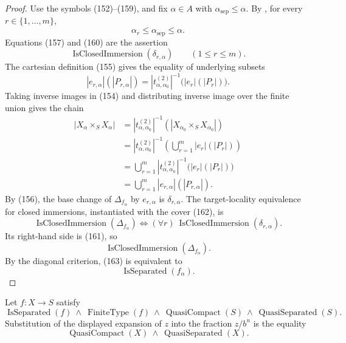 \begin{proof}
  Use the symbols (152)--(159), and fix
  $\alpha\in A$ with $\alpha_{\mathrm{sep}}\leq\alpha$.  By
  , for every
  $r\in\{1,\ldots,m\}$,
  \[
    \alpha_r\leq\alpha_{\mathrm{sep}}\leq\alpha.                 \tag{160}
  \]
  Equations (157) and (160) are the assertion
  \[
    \operatorname{IsClosedImmersion}(\delta_{r,\alpha})
      \qquad(1\leq r\leq m).
                                                                    \tag{161}
  \]
  The cartesian definition (155) gives the equality of underlying subsets
  \[
    |e_{r,\alpha}|(|P_{r,\alpha}|)
      =|t^{(2)}_{\alpha,\alpha_0}|^{-1}\bigl(|e_r|(|P_r|)\bigr).
  \]
  Taking inverse images in (154) and distributing inverse image over the
  finite union gives the chain
  \[
  \begin{aligned}
    |X_\alpha\times_SX_\alpha|
      &=|t^{(2)}_{\alpha,\alpha_0}|^{-1}
          \left(\left|X_{\alpha_0}\times_SX_{\alpha_0}\right|\right)\\
      &=|t^{(2)}_{\alpha,\alpha_0}|^{-1}
          \left(\bigcup_{r=1}^m|e_r|(|P_r|)\right)\\
      &=\bigcup_{r=1}^m
          |t^{(2)}_{\alpha,\alpha_0}|^{-1}\bigl(|e_r|(|P_r|)\bigr)\\
      &=\bigcup_{r=1}^m|e_{r,\alpha}|(|P_{r,\alpha}|).
  \end{aligned}                                                   \tag{162}
  \]
  By (156), the base change of $\Delta_{f_\alpha}$ by
  $e_{r,\alpha}$ is $\delta_{r,\alpha}$.  The target-locality equivalence for
  closed immersions, instantiated with the cover (162), is
  \[
    \operatorname{IsClosedImmersion}(\Delta_{f_\alpha})
      \Longleftrightarrow
    (\forall r)\ \operatorname{IsClosedImmersion}(\delta_{r,\alpha}).
  \]
  Its right-hand side is (161), so
  \[
    \operatorname{IsClosedImmersion}(\Delta_{f_\alpha}).          \tag{163}
  \]
  By the diagonal criterion, (163) is equivalent to
  \[
    \operatorname{IsSeparated}(f_\alpha).
  \]
\end{proof}

\begin{lemma}
  \label{lemma:nagata-qcqs-source-separated-finite-type}
  \lean{}

  Let \(f\colon X\to S\) satisfy
  \[
    \operatorname{IsSeparated}(f)\ \wedge\
    \operatorname{FiniteType}(f)\ \wedge\
    \operatorname{QuasiCompact}(S)\ \wedge\
    \operatorname{QuasiSeparated}(S).
  \]
  Substitution of the displayed expansion of $z$ into the fraction $z/b^n$
  is the equality
  \[
    \operatorname{QuasiCompact}(X)\ \wedge\
    \operatorname{QuasiSeparated}(X).
  \]
\end{lemma}

